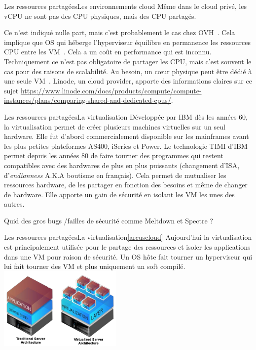 \documentclass{beamer}
\begin{document}
    \begin{frame}{Les ressources partagées}{Les environnements cloud}
        Même dans le cloud privé, les vCPU ne sont pas des CPU physiques, mais des CPU partagés.

        Ce n'est indiqué nulle part, mais c'est probablement le cas chez OVH~.
        Cela implique que OS qui héberge l'hyperviseur équilibre en permanence les ressources CPU entre les VM~.
        Cela a un coût en performance qui est inconnu.
        \bigbreak
        Techniquement ce n'est pas obligatoire de partager les CPU, mais c'est souvent le cas pour des raisons de scalabilité.
        Au besoin, un cœur physique peut être dédié à une seule VM~.
        \bigbreak
        Linode, un cloud provider, apporte des informations claires sur ce sujet \url{https://www.linode.com/docs/products/compute/compute-instances/plans/comparing-shared-and-dedicated-cpus/}.

    \end{frame}

    \begin{frame}{Les ressources partagées}{La virtualisation}
        Développée par IBM dès les années 60, la virtualisation permet de créer plusieurs machines virtuelles sur un seul hardware.
        Elle fut d'abord commercialement disponible sur les mainframes avant les plus petites plateformes AS400, iSeries et Power.
        Le technologie TIMI d'IBM permet depuis les années 80 de faire tourner des programmes qui restent compatibles avec des hardwares de plus en plus puissants (changement d'ISA, d'\textit{endianness} A.K.A boutisme en français).
        \bigbreak
        Cela permet de mutualiser les ressources hardware, de les partager en fonction des besoins et même de changer de hardware.
        \bigbreak
        Elle apporte un gain de sécurité en isolant les VM les unes des autres.
        \begin{dangercolorbox}
            Quid des gros bugs /failles de sécurité comme Meltdown et Spectre ?
        \end{dangercolorbox}
    \end{frame}

    \begin{frame}{Les ressources partagées}{La virtualisation\cref{arcuscloud}}
        Aujourd'hui la virtualisation est principalement utilisée pour le partage des ressources et isoler les applications dans une VM pour raison de sécurité.
        Un OS hôte fait tourner un hyperviseur qui lui fait tourner des VM et plus uniquement un soft compilé.
        \bigbreak
        \centering
        \includegraphics[width=6cm]{image/virtualisation}
    \end{frame}
\end{document}
